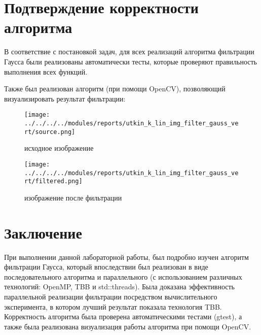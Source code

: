 \documentclass{report}
\begin{document}
	\newpage


	\section*{Подтверждение корректности алгоритма}

	\par В соответствие с постановкой задач, для всех реализаций алгоритма фильтрации Гаусса были реализованы автоматически тесты, которые проверяют правильность выполнения всех функций.
	\par Также был реализован алгоритм (при помощи OpenCV), позволяющий визуализировать результат фильтрации:

	\begin{figure}[htbp]
		\centering
		\texttt{[image: ../../../../modules/reports/utkin\_k\_lin\_img\_filter\_gauss\_vert/source.png]}
		\caption{исходное изображение}
	\end{figure}

	\begin{figure}[htbp]
		\centering
		\texttt{[image: ../../../../modules/reports/utkin\_k\_lin\_img\_filter\_gauss\_vert/filtered.png]}
		\caption{изображение после фильтрации}
	\end{figure}

	\newpage


	\section*{Заключение}

	\par При выполнении данной лабораторной работы, был подробно изучен алгоритм фильтрации Гаусса, который впоследствии был реализован в виде последовательного алгоритма и параллельного (с использованием различных технологий: OpenMP, TBB и std::threads). Была доказана эффективность параллельной реализации фильтрации посредством вычислительного эксперимента, в котором лучший результат показала технология TBB. Корректность алгоритма была проверена автоматическими тестами (gtest), а также была реализована визуализация работы алгоритма при помощи OpenCV.

	\newpage

\end{document}
